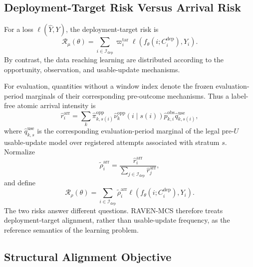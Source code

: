 \documentclass[letterpaper,journal]{IEEEtran}
\begin{document}
\subsection{Deployment-Target Risk Versus Arrival Risk}
\label{subsec:target_risk}

For a loss $\ell(\widehat Y,Y)$, the deployment-target risk is
\begin{equation}
 \mathcal{R}_{\mu}(\theta)
 =
 \sum_{i\in\mathcal{I}_{\mathrm{dep}}}
 \varpi_i^{\mathrm{tar}}
 \ell\!\left(
 f_{\theta}(i;C_i^{\mathrm{dep}}),Y_i
 \right).
 \label{eq:target_risk}
\end{equation}
By contrast, the data reaching learning are distributed according to the
opportunity, observation, and usable-update mechanisms.

For evaluation, quantities without a window index denote the frozen
evaluation-period marginals of their corresponding pre-outcome mechanisms.
Thus a label-free atomic arrival intensity is
\begin{equation}
 \widehat r_i^{\mathrm{arr}}
 =
 \sum_k
 \widehat\pi^{\mathrm{opp}}_{k,s(i)}
 \widehat\nu^{\mathrm{opp}}_{k}(i\mid s(i))
 \widehat p^{\mathrm{obs}}_{k,i}
 \widehat q^{\mathrm{use}}_{k,s(i)},
 \label{eq:arrival_intensity}
\end{equation}
where $\widehat q^{\mathrm{use}}_{k,s}$ is the corresponding
evaluation-period marginal of the legal pre-$U$ usable-update model over
registered attempts associated with stratum $s$.  Normalize
\begin{equation}
 \widetilde\rho_i^{\mathrm{arr}}
 =
 \frac{\widehat r_i^{\mathrm{arr}}}
 {\sum_{j\in\mathcal{I}_{\mathrm{dep}}}\widehat r_j^{\mathrm{arr}}},
 \label{eq:arrival_distribution}
\end{equation}
and define
\begin{equation}
 \mathcal{R}_{\rho}(\theta)
 =
 \sum_{i\in\mathcal{I}_{\mathrm{dep}}}
 \widetilde\rho_i^{\mathrm{arr}}
 \ell\!\left(
 f_{\theta}(i;C_i^{\mathrm{dep}}),Y_i
 \right).
 \label{eq:arrival_risk}
\end{equation}
The two risks answer different questions.  RAVEN-MCS therefore treats
deployment-target alignment, rather than usable-update frequency, as the
reference semantics of the learning problem.

\subsection{Structural Alignment Objective}
\label{subsec:design_objective}
\end{document}
